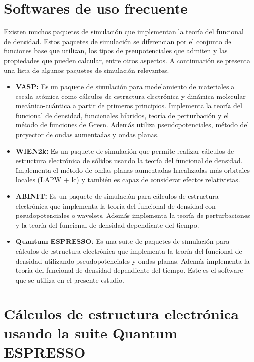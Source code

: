 \section{Softwares de uso frecuente}

Existen muchos paquetes de simulaci\'on que implementan la teor\'ia del 
funcional de densidad. Estos paquetes de simulaci\'on se diferencian por el 
conjunto de funciones base que utilizan, los tipos de pseupotenciales que 
admiten y las propiedades que pueden calcular, entre otros aspectos. A 
continuaci\'on se presenta una lista de algunos paquetes de simulaci\'on 
relevantes.

\begin{itemize}
    \item \textbf{VASP:}  Es un paquete de simulaci\'on para modelamiento de 
    materiales a escala at\'omica como c\'alculos de estructura electr\'onica y 
    din\'amica molecular mec\'anico-cu\'antica a partir de primeros principios. 
    Implementa la teor\'ia del funcional de densidad, funcionales h\'ibridos, 
    teor\'ia de perturbaci\'on y el m\'etodo de funciones de Green. Adem\'as 
    utiliza pseudopotenciales, m\'etodo del proyector de ondas aumentadas y 
    ondas planas.
    \item \textbf{WIEN2k:} Es un paquete de simulaci\'on que permite realizar 
    c\'alculos de estructura electr\'onica de s\'olidos usando la teor\'ia del 
    funcional de densidad. Implementa el m\'etodo de ondas planas aumentadas 
    linealizadas m\'as orbitales locales (LAPW + lo) y tambi\'en es capaz de 
    considerar efectos relativistas.
    \item \textbf{ABINIT:} Es un paquete de simulaci\'on para c\'alculos de 
    estructura electr\'onica que implementa la teor\'ia del funcional de 
    densidad con pseudopotenciales o wavelets. Adem\'as implementa la teor\'ia 
    de perturbaciones y la teor\'ia del funcional de densidad dependiente del 
    tiempo.
    \item \textbf{Quantum ESPRESSO:} Es una suite de paquetes de simulaci\'on 
    para c\'alculos de estructura electr\'onica que implementa la teor\'ia del 
    funcional de densidad utilizando pseudopotenciales y ondas planas. Adem\'as 
    implementa la teor\'ia del funcional de densidad dependiente del tiempo. 
    Este es el software que se utiliza en el presente estudio.
\end{itemize}


\section[C\'alculos de estructura electr\'onica usando la suite Quantum \\
ESPRESSO]{C\'alculos de estructura electr\'onica usando la suite Quantum 
ESPRESSO}

